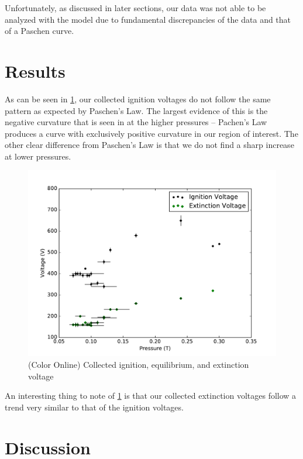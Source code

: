 \documentclass[reprint]{revtex4-1}
\begin{document}
Unfortunately, as discussed in later sections, our data was not able to be analyzed with the model due to fundamental discrepancies of the data and that of a Paschen curve.

\section{Results}

As can be seen in \cref{fig:ignition-extinction}, our collected ignition voltages do not follow the same pattern as expected by Paschen's Law. The largest evidence of this is the negative curvature that is seen in at the higher pressures -- Pachen's Law produces a curve with exclusively positive curvature in our region of interest. The other clear difference from Paschen's Law is that we do not find a sharp increase at lower pressures.

\begin{figure}[h]
\includegraphics[width=\columnwidth]{../resources/ignition-extinction.pdf}
\caption{(Color Online) Collected ignition, equilibrium, and extinction voltage}
\label{fig:ignition-extinction}
\end{figure}

An interesting thing to note of \cref{fig:ignition-extinction} is that our collected extinction voltages follow a trend very similar to that of the ignition voltages.

\section{Discussion}
\end{document}
